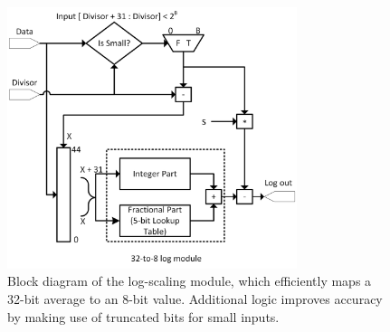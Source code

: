 \begin{figure}[htbp]
\begin{center}
\includegraphics[width=20pc]{figures/vpm_figures/log2_v5.png}

\caption[Block diagram of the fixed-point log scaling module]{Block diagram of the log-scaling module, which efficiently maps a 32-bit average to an 8-bit value. Additional logic improves accuracy by making use of truncated bits for small inputs.}
\label{fig:logscaling}
\end{center}
\end{figure}

